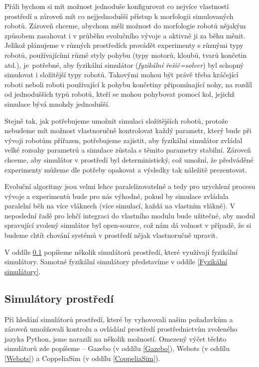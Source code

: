 Přáli bychom si mít možnost jednoduše konfigurovat co nejvíce vlastností
prostředí a zároveň mít co nejjednodušší přístup k morfologii simulovaných
robotů. Zároveň chceme, abychom měli možnost do morfologie robotů nějakým
způsobem zasahovat i v průběhu evolučního vývoje a aktivně ji za běhu měnit.
Jelikož plánujeme v různých prostředích provádět experimenty s různými typy
robotů, používajícími různé styly pohybu (typy motorů, kloubů, tvarů končetin
atd.), je~potřebné, aby fyzikální simulátor (\emph{fyzikální řešič=solver}) byl
schopný simulovat i složitější typy robotů. Takovými mohou být právě třeba
kráčející roboti neboli roboti používající k pohybu končetiny připomínající
nohy, na rozdíl od jednodušších typů robotů, kteří se mohou pohybovat pomocí
kol, jejichž simulace bývá mnohdy jednodušší. 

Stejně tak, jak potřebujeme umožnit simulaci složitějších robotů, protože
nebudeme mít možnost vlastnoručně kontrolovat každý parametr, který bude při
vývoji robotům přiřazen, potřebujeme zajistit, aby fyzikální simulátor zvládal
velké rozsahy parametrů a simulace zůstala s těmito parametry stabilní. Zároveň
chceme, aby simulátor v prostředí byl deterministický, což umožní, že
předváděné experimenty můžeme dle potřeby opakovat a výsledky tak náležitě
prezentovat. 

Evoluční algoritmy jsou velmi lehce paralelizovatelné a tedy pro
urychlení procesu vývoje a experimentů bude pro nás výhodné, pokud by simulace
zvládala paralelní běh na více vláknech (více simulací, každá na vlastním
vlákně). V neposlední řadě pro lehčí integraci do vlastního modulu bude
užitečné, aby modul spravující zvolený simulátor byl open-source, což nám dá
volnost v případě, že si budeme chtít chování systémů v prostředí nějak
vlastnoručně upravit.

V oddíle \ref{Simulátory prostředí} popíšeme několik simulátorů prostředí,
které využívají fyzikální simulátory. Samotné fyzikální simulátory představíme
v oddíle \ref{Fyzikální simulátory}.

\subsection{Simulátory prostředí} \label{Simulátory prostředí}

Při hledání simulátorů prostředí, které by vyhovovali našim požadavkům
a zároveň umožňovali kontrolu a ovládání prostředí prostřednictvím zvoleného jazyka
Python, jsme narazili na několik možností. Omezený výčet těchto simulátorů zde
popíšeme -- Gazebo (v oddílu \ref{Gazebo}), Webots (v oddílu \ref{Webots}) a
CoppeliaSim (v oddílu \ref{CoppeliaSim}).

